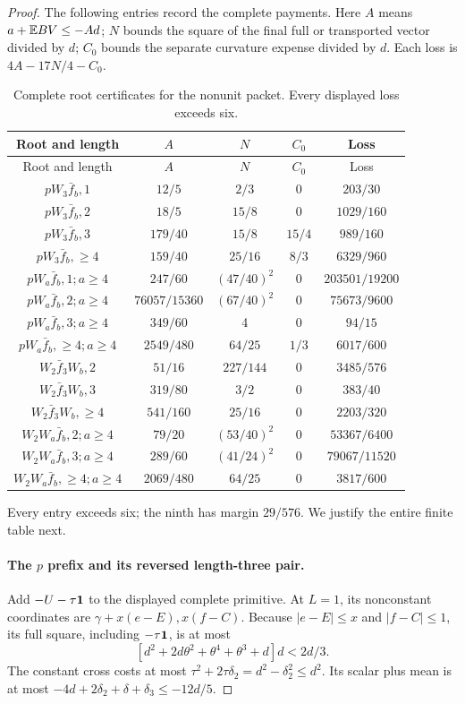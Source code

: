 \begin{proof}
The following entries record the complete payments. Here \(A\) means
\(a+\mathbb E BV\le-Ad\); \(N\) bounds the square of the final full or
transported vector divided by \(d\); \(C_0\) bounds the separate
curvature expense divided by \(d\). Each loss is \(4A-17N/4-C_0\).
\begingroup\small
{}
\begin{longtable}{@{}ccccc@{}}
\caption{Complete root certificates for the nonunit packet.
Every displayed loss exceeds six.}
\label{tab:odd-two:payments}\\
\toprule
Root and length&\(A\)&\(N\)&\(C_0\)&Loss\\\midrule
\endfirsthead
\toprule
Root and length&\(A\)&\(N\)&\(C_0\)&Loss\\\midrule
\endhead
\(pW_3\bar f_b,1\)&\(12/5\)&\(2/3\)&0&\(203/30\)\\
\(pW_3\bar f_b,2\)&\(18/5\)&\(15/8\)&0&\(1029/160\)\\
\(pW_3\bar f_b,3\)&\(179/40\)&\(15/8\)&\(15/4\)&\(989/160\)\\
\(pW_3\bar f_b,\ge4\)&\(159/40\)&\(25/16\)&\(8/3\)&\(6329/960\)\\
\(pW_a\bar f_b,1; a\ge4\)&\(247/60\)&\((47/40)^2\)&0&\(203501/19200\)\\
\(pW_a\bar f_b,2; a\ge4\)&\(76057/15360\)&\((67/40)^2\)&0&\(75673/9600\)\\
\(pW_a\bar f_b,3; a\ge4\)&\(349/60\)&4&0&\(94/15\)\\
\(pW_a\bar f_b,\ge4; a\ge4\)&\(2549/480\)&\(64/25\)&\(1/3\)&\(6017/600\)\\
\(W_2\bar f_3W_b,2\)&\(51/16\)&\(227/144\)&0&\(3485/576\)\\
\(W_2\bar f_3W_b,3\)&\(319/80\)&\(3/2\)&0&\(383/40\)\\
\(W_2\bar f_3W_b,\ge4\)&\(541/160\)&\(25/16\)&0&\(2203/320\)\\
\(W_2W_a\bar f_b,2; a\ge4\)&\(79/20\)&\((53/40)^2\)&0&\(53367/6400\)\\
\(W_2W_a\bar f_b,3; a\ge4\)&\(289/60\)&\((41/24)^2\)&0&\(79067/11520\)\\
\(W_2W_a\bar f_b,\ge4; a\ge4\)&\(2069/480\)&\(64/25\)&0&\(3817/600\)\\
\bottomrule
\end{longtable}
\endgroup
Every entry exceeds six; the ninth has margin \(29/576\).
We justify the entire finite table next.

\paragraph{The \(p\) prefix and its reversed length-three pair.}
\label{part:odd-two:p-three}
Add \(-U-\tau\mathbf1\) to the displayed complete primitive.
At \(L=1\), its nonconstant coordinates are
\(\gamma+x(e-E),x(f-C)\). Because \(|e-E|\le x\) and
\(|f-C|\le1\), its full square, including \(-\tau\mathbf1\), is at most
\[
 [d^2+2d\theta^2+\theta^4+\theta^3+d]d<2d/3.
\]
The constant cross costs at most
\(\tau^2+2\tau\delta_2=d^2-\delta_2^2\le d^2\).
Its scalar plus mean is at most
\(-4d+2\delta_2+\delta+\delta_3\le-12d/5\).


\end{proof}
